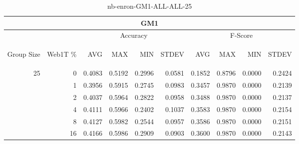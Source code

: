 \begin{center}
\begin{table}[htbp]
\begin{tabular}{ | r | r | r | r | r | r | r | r | r | r |}
\hline
\multicolumn{10}{|c|}{GM1}\\
\hline
 & & \multicolumn{4}{|c|}{Accuracy} & \multicolumn{4}{|c|}{F-Score}\\ \cline{3-10}
\begin{sideways}Group Size\end{sideways} & \begin{sideways}Web1T \%\end{sideways} & \begin{sideways}AVG\end{sideways} & \begin{sideways}MAX\end{sideways} & \begin{sideways}MIN\end{sideways} & \begin{sideways}STDEV\end{sideways} & \begin{sideways}AVG\end{sideways} & \begin{sideways}MAX\end{sideways} & \begin{sideways}MIN\end{sideways} & \begin{sideways}STDEV\end{sideways}\\
\hline
\multirow{5}{*}{25}
 & 0 & 0.4083 & 0.5192 & 0.2996 & 0.0581 & 0.1852 & 0.8796 & 0.0000 & 0.2424\\ \cline{2-10}
 & 1 & 0.3956 & 0.5915 & 0.2745 & 0.0983 & 0.3457 & 0.9870 & 0.0000 & 0.2139\\ \cline{2-10}
 & 2 & 0.4037 & 0.5964 & 0.2822 & 0.0958 & 0.3488 & 0.9870 & 0.0000 & 0.2137\\ \cline{2-10}
 & 4 & 0.4111 & 0.5966 & 0.2402 & 0.1037 & 0.3583 & 0.9870 & 0.0000 & 0.2154\\ \cline{2-10}
 & 8 & 0.4127 & 0.5982 & 0.2544 & 0.0957 & 0.3586 & 0.9870 & 0.0000 & 0.2151\\ \cline{2-10}
 & 16 & 0.4166 & 0.5986 & 0.2909 & 0.0903 & 0.3600 & 0.9870 & 0.0000 & 0.2143\\ \cline{2-10}
\hline
\end{tabular}
\caption{nb-enron-GM1-ALL-ALL-25}
\label{table:nb-enron-GM1-ALL-ALL-25}
\end{table}
\end{center}

